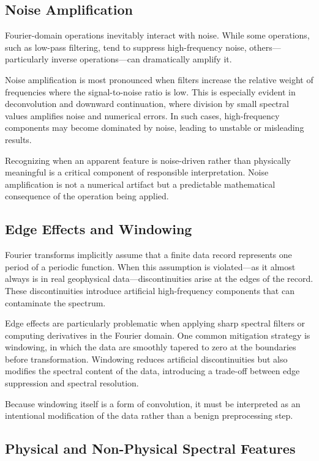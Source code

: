 \subsection{Noise Amplification}

Fourier-domain operations inevitably interact with noise. While some operations, such as low-pass filtering, tend to suppress high-frequency noise, others—particularly inverse operations—can dramatically amplify it.

Noise amplification is most pronounced when filters increase the relative weight of frequencies where the signal-to-noise ratio is low. This is especially evident in deconvolution and downward continuation, where division by small spectral values amplifies noise and numerical errors. In such cases, high-frequency components may become dominated by noise, leading to unstable or misleading results.

Recognizing when an apparent feature is noise-driven rather than physically meaningful is a critical component of responsible interpretation. Noise amplification is not a numerical artifact but a predictable mathematical consequence of the operation being applied.

\subsection{Edge Effects and Windowing}

Fourier transforms implicitly assume that a finite data record represents one period of a periodic function. When this assumption is violated—as it almost always is in real geophysical data—discontinuities arise at the edges of the record. These discontinuities introduce artificial high-frequency components that can contaminate the spectrum.

Edge effects are particularly problematic when applying sharp spectral filters or computing derivatives in the Fourier domain. One common mitigation strategy is windowing, in which the data are smoothly tapered to zero at the boundaries before transformation. Windowing reduces artificial discontinuities but also modifies the spectral content of the data, introducing a trade-off between edge suppression and spectral resolution.

Because windowing itself is a form of convolution, it must be interpreted as an intentional modification of the data rather than a benign preprocessing step.

\subsection{Physical and Non-Physical Spectral Features}

